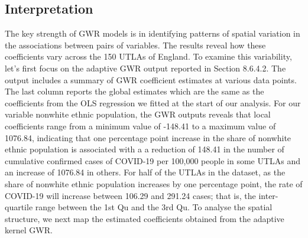 \documentclass[
]{book}
\begin{document}
\hypertarget{interpretation-1}{%
\subsection{Interpretation}\label{interpretation-1}}

The key strength of GWR models is in identifying patterns of spatial variation in the associations between pairs of variables. The results reveal how these coefficients vary across the 150 UTLAs of England. To examine this variability, let's first focus on the adaptive GWR output reported in Section 8.6.4.2. The output includes a summary of GWR coefficient estimates at various data points. The last column reports the global estimates which are the same as the coefficients from the OLS regression we fitted at the start of our analysis. For our variable nonwhite ethnic population, the GWR outputs reveals that local coefficients range from a minimum value of -148.41 to a maximum value of 1076.84, indicating that one percentage point increase in the share of nonwhite ethnic population is associated with a a reduction of 148.41 in the number of cumulative confirmed cases of COVID-19 per 100,000 people in some UTLAs and an increase of 1076.84 in others. For half of the UTLAs in the dataset, as the share of nonwhite ethnic population increases by one percentage point, the rate of COVID-19 will increase between 106.29 and 291.24 cases; that is, the inter-quartile range between the 1st Qu and the 3rd Qu. To analyse the spatial structure, we next map the estimated coefficients obtained from the adaptive kernel GWR.
\end{document}
